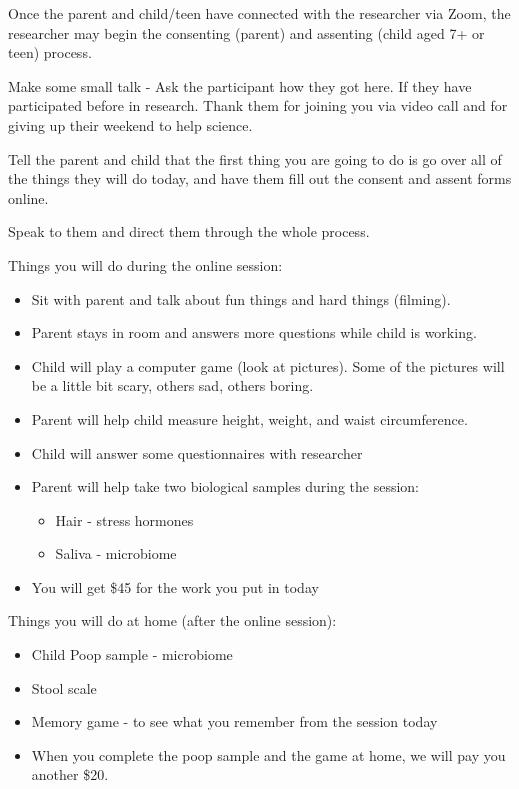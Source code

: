 \documentclass[]{book}
\providecommand{\tightlist}{%
  \setlength{\itemsep}{0pt}\setlength{\parskip}{0pt}}
\begin{document}
Once the parent and child/teen have connected with the researcher via Zoom, the researcher may begin the consenting (parent) and assenting (child aged 7+ or teen) process.

Make some small talk - Ask the participant how they got here. If they have participated before in research. Thank them for joining you via video call and for giving up their weekend to help science.

Tell the parent and child that the first thing you are going to do is go over all of the things they will do today, and have them fill out the consent and assent forms online.

Speak to them and direct them through the whole process.

Things you will do during the online session:

\begin{itemize}
\tightlist
\item
  Sit with parent and talk about fun things and hard things (filming).
\item
  Parent stays in room and answers more questions while child is working.
\item
  Child will play a computer game (look at pictures). Some of the pictures will be a little bit scary, others sad, others boring.
\item
  Parent will help child measure height, weight, and waist circumference.
\item
  Child will answer some questionnaires with researcher
\item
  Parent will help take two biological samples during the session:

  \begin{itemize}
  \tightlist
  \item
    Hair - stress hormones
  \item
    Saliva - microbiome
  \end{itemize}
\item
  You will get \$45 for the work you put in today
\end{itemize}

Things you will do at home (after the online session):

\begin{itemize}
\tightlist
\item
  Child Poop sample - microbiome
\item
  Stool scale
\item
  Memory game - to see what you remember from the session today
\item
  When you complete the poop sample and the game at home, we will pay you another \$20.
\end{itemize}
\end{document}
